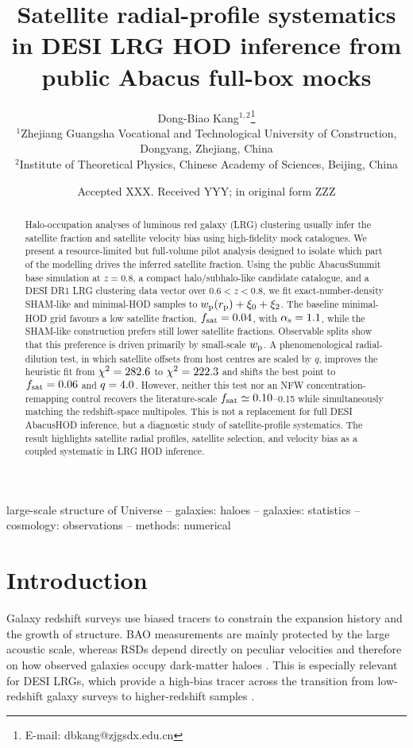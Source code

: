 \documentclass[fleqn,usenatbib]{mnras}
\title[Satellite-profile systematics in LRG HOD fits]{Satellite radial-profile systematics in DESI LRG HOD inference from public Abacus full-box mocks}
\author[Kang]{
Dong-Biao Kang$^{1,2}$\thanks{E-mail: dbkang@zjgsdx.edu.cn}
\\
$^{1}$Zhejiang Guangsha Vocational and Technological University of Construction, Dongyang, Zhejiang, China\\
$^{2}$Institute of Theoretical Physics, Chinese Academy of Sciences, Beijing, China
}
\date{Accepted XXX. Received YYY; in original form ZZZ}
\newcommand{\fsat}{f_{\rm sat}}
\newcommand{\alphas}{\alpha_{\rm s}}
\newcommand{\wproj}{w_{\rm p}}
\newcommand{\xizero}{\xi_0}
\newcommand{\xitwo}{\xi_2}
\begin{document}
\label{firstpage}
\pagerange{\pageref{firstpage}--\pageref{lastpage}}
\maketitle

\begin{abstract}
Halo-occupation analyses of luminous red galaxy (LRG) clustering usually infer the satellite fraction and satellite velocity bias using high-fidelity mock catalogues.  We present a resource-limited but full-volume pilot analysis designed to isolate which part of the modelling drives the inferred satellite fraction.  Using the public AbacusSummit base simulation at $z=0.8$, a compact halo/subhalo-like candidate catalogue, and a DESI DR1 LRG clustering data vector over $0.6<z<0.8$, we fit exact-number-density SHAM-like and minimal-HOD samples to $\wproj(r_{\rm p})+\xizero+\xitwo$.  The baseline minimal-HOD grid favours a low satellite fraction, $\fsat=\BestHODFsat$, with $\alphas=\BestHODAlpha$, while the SHAM-like construction prefers still lower satellite fractions.  Observable splits show that this preference is driven primarily by small-scale $\wproj$.  A phenomenological radial-dilution test, in which satellite offsets from host centres are scaled by $q$, improves the heuristic fit from $\chi^2=282.6$ to $\chi^2=222.3$ and shifts the best point to $\fsat=\BestDilFsat$ and $q=4.0$.  However, neither this test nor an NFW concentration-remapping control recovers the literature-scale $\fsat\simeq0.10$--0.15 while simultaneously matching the redshift-space multipoles.  This is not a replacement for full DESI AbacusHOD inference, but a diagnostic study of satellite-profile systematics.  The result highlights satellite radial profiles, satellite selection, and velocity bias as a coupled systematic in LRG HOD inference.
\end{abstract}

\begin{keywords}
large-scale structure of Universe -- galaxies: haloes -- galaxies: statistics -- cosmology: observations -- methods: numerical
\end{keywords}

\section{Introduction}

Galaxy redshift surveys use biased tracers to constrain the expansion history and the growth of structure.  BAO measurements are mainly protected by the large acoustic scale, whereas RSDs depend directly on peculiar velocities and therefore on how observed galaxies occupy dark-matter haloes \citep{Kaiser1987,Hamilton1998}.  This is especially relevant for DESI LRGs, which provide a high-bias tracer across the transition from low-redshift galaxy surveys to higher-redshift samples \citep{DESI2016,DESI2024BAO,DESI2024Samples}.
\end{document}
